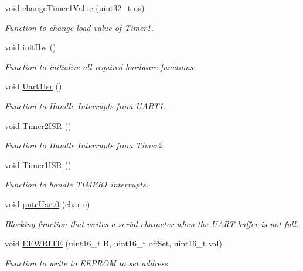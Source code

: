\begin{DoxyCompactItemize}
void \mbox{\hyperlink{satej__matthew_8c_ae0e2b59e29ecdbadeb6bfa1a9efa5a85}{change\+Timer1\+Value}} (uint32\+\_\+t us)
\begin{DoxyCompactList}\small\item\em Function to change load value of Timer1. \end{DoxyCompactList}\item 
void \mbox{\hyperlink{satej__matthew_8c_ae5e20c90f0611c1fd09fad99cc3a30a6}{init\+Hw}} ()
\begin{DoxyCompactList}\small\item\em Function to initialize all required hardware functions. \end{DoxyCompactList}\item 
void \mbox{\hyperlink{satej__matthew_8c_a522b69f2f6e7fa7fc03d455ec3ffb6e8}{Uart1\+Isr}} ()
\begin{DoxyCompactList}\small\item\em Function to Handle Interrupts from U\+A\+R\+T1. \end{DoxyCompactList}\item 
void \mbox{\hyperlink{satej__matthew_8c_af0a12620be9cfe02c43ff4c8d6556fe2}{Timer2\+I\+SR}} ()
\begin{DoxyCompactList}\small\item\em Function to Handle Interrupts from Timer2. \end{DoxyCompactList}\item 
void \mbox{\hyperlink{satej__matthew_8c_a7829469bbaa6a5d7e77e19e1d55b673e}{Timer1\+I\+SR}} ()
\begin{DoxyCompactList}\small\item\em Function to handle T\+I\+M\+E\+R1 interrupts. \end{DoxyCompactList}\item 
void \mbox{\hyperlink{satej__matthew_8c_a27ebab6950bfb65d641dd04feb03906f}{putc\+Uart0}} (char c)
\begin{DoxyCompactList}\small\item\em Blocking function that writes a serial character when the U\+A\+RT buffer is not full. \end{DoxyCompactList}\item 
void \mbox{\hyperlink{satej__matthew_8c_a31b9c21cfe092a5574eb605046951401}{E\+E\+W\+R\+I\+TE}} (uint16\+\_\+t B, uint16\+\_\+t off\+Set, uint16\+\_\+t val)
\begin{DoxyCompactList}\small\item\em Function to write to E\+E\+P\+R\+OM to set address. \end{DoxyCompactList}\item 

\end{DoxyCompactItemize}
